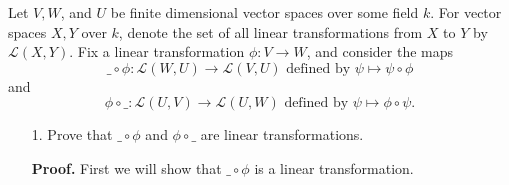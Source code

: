 \documentclass[9pt]{article}
\begin{document}
Let $V, W$, and $U$ be finite dimensional vector spaces over some field $k$. For 
vector spaces $X, Y$ over $k$, denote the set of all linear transformations from
$X$ to $Y$ by $\mathcal{L}(X, Y)$. Fix a linear transformation
$\phi : V \rightarrow W$, and consider the maps
$$\_ \circ \phi : \mathcal{L}(W, U) \rightarrow \mathcal{L}(V, U)
  \text{ defined by } \psi \mapsto \psi \circ \phi$$
and
$$\phi \circ \_ : \mathcal{L}(U, V) \rightarrow \mathcal{L}(U, W)
  \text{ defined by } \psi \mapsto \phi \circ \psi.$$
\begin{enumerate}
   \item[1.]   Prove that $\_ \circ \phi$ and $\phi \circ \_$ are linear
               transformations.

      \textbf{Proof.} First we will show that $\_ \circ \phi$ is a linear
      transformation.


\end{enumerate}
\end{document}
